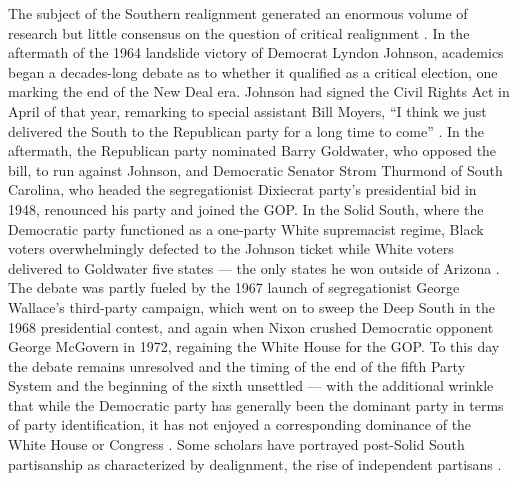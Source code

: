 The subject of the Southern realignment generated an enormous volume of research but little consensus on the question of critical realignment \citep{buchanan_realignment_2002, beck_partisan_1977, hammond_minor_1976, bartels_partisanship_2000, black_rise_2009, black_transformation_2004, campbell_party_2006, schickler2016racial}. In the aftermath of the 1964 landslide victory of Democrat Lyndon Johnson, academics began a decades-long debate as to whether it qualified as a critical election, one marking the end of the New Deal era. Johnson had signed the Civil Rights Act in April of that year, remarking to special assistant Bill Moyers, ``I think we just delivered the South to the Republican party for a long time to come'' \citep{moyers_moyers_2015}. In the aftermath, the Republican party nominated Barry Goldwater, who opposed the bill, to run against Johnson, and Democratic Senator Strom Thurmond of South Carolina, who headed the segregationist Dixiecrat party's presidential bid in 1948, renounced his party and joined the GOP. In the Solid South, where the Democratic party functioned as a one-party White supremacist regime, Black voters overwhelmingly defected to the Johnson ticket while White voters delivered to Goldwater five states --- the only states he won outside of Arizona  \citep{converse_change_1972, segal_partisan_1968}. The debate was partly fueled by the 1967 launch of segregationist George Wallace's third-party campaign, which went on to sweep the Deep South in the 1968 presidential contest, and again when Nixon crushed Democratic opponent George McGovern in 1972, regaining the White House for the GOP. To this day the debate remains unresolved and the timing of the end of the fifth Party System and the beginning of the sixth unsettled --- with the additional wrinkle that while the Democratic party has generally been the dominant party in terms of party identification, it has not enjoyed a corresponding dominance of the White House or Congress \citep{lawrence_collapse_1997, mayer_divided_1996}. Some scholars have portrayed post-Solid South partisanship as characterized by dealignment, the rise of independent partisans \citep{carmines_unrealized_1987, beck_partisan_1977}.

